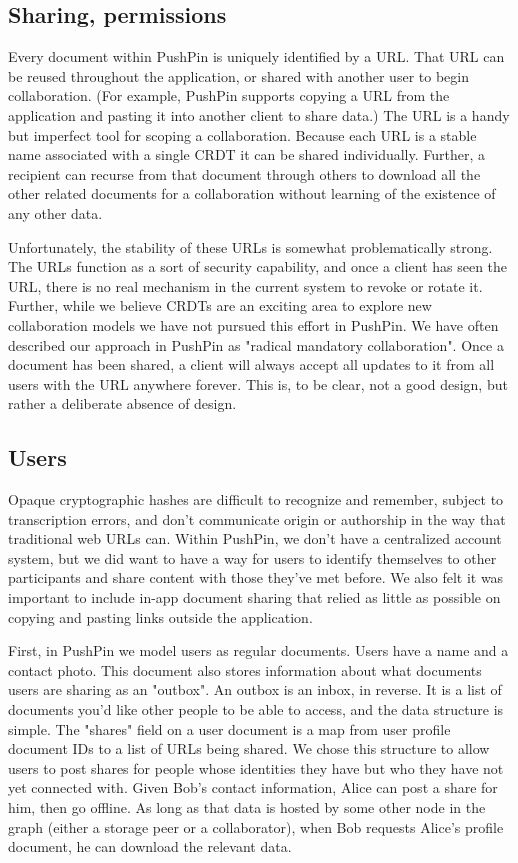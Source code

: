 \documentclass[sigplan,10pt]{acmart}
\begin{document}
\subsection{Sharing, permissions}

Every document within PushPin is uniquely identified by a URL. That URL can be reused throughout the application, or shared with another user to begin collaboration. (For example, PushPin supports copying a URL from the application and pasting it into another client to share data.) The URL is a handy but imperfect tool for scoping a collaboration. Because each URL is a stable name associated with a single CRDT it can be shared individually. Further, a recipient can recurse from that document through others to download all the other related documents for a collaboration without learning of the existence of any other data. 

Unfortunately, the stability of these URLs is somewhat problematically strong. The URLs function as a sort of security capability, and once a client has seen the URL, there is no real mechanism in the current system to revoke or rotate it. Further, while we believe CRDTs are an exciting area to explore new collaboration models \cite{Pixelpusher} we have not pursued this effort in PushPin. We have often described our approach in PushPin as "radical mandatory collaboration". Once a document has been shared, a client will always accept all updates to it from all users with the URL anywhere forever. This is, to be clear, not a good design, but rather a deliberate absence of design. 

\subsection{Users}

Opaque cryptographic hashes are difficult to recognize and remember, subject to transcription errors, and don't communicate origin or authorship in the way that traditional web URLs can. Within PushPin, we don't have a centralized account system, but we did want to have a way for users to identify themselves to other participants and share content with those they've met before. We also felt it was important to include in-app document sharing that relied as little as possible on copying and pasting links outside the application.

First, in PushPin we model users as regular documents. Users have a name and a contact photo. This document also stores information about what documents users are sharing as an "outbox". An outbox is an inbox, in reverse. It is a list of documents you'd like other people to be able to access, and the data structure is simple. The "shares" field on a user document is a map from user profile document IDs to a list of URLs being shared. We chose this structure to allow users to post shares for people whose identities they have but who they have not yet connected with. Given Bob's contact information, Alice can post a share for him, then go offline. As long as that data is hosted by some other node in the graph (either a storage peer or a collaborator), when Bob requests Alice's profile document, he can download the relevant data.
\end{document}
